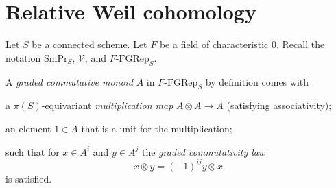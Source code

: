 \documentclass[a4paper,10pt]{article}
\def\basepieces{\mathscr{V}}
\def\smpr{\mathrm{SmPr}}
\newcommand{\fgrep}[2]{#1\textrm{-}\mathrm{FGRep}_{#2}}
\def\tensor{\otimes}
\begin{document}
\section{Relative Weil cohomology}

Let $S$ be a connected scheme. Let $F$ be a field of characteristic $0$. Recall
the notation $\smpr_{S}$, $\basepieces$, and $\fgrep{F}{S}$.

A \emph{graded commutative monoid} $A$ in $\fgrep{F}{S}$ by definition comes
with
\begin{enumerate*}[label=(\alph*)] %
	\item a $\pi(S)$-equivariant \emph{multiplication map} $A \tensor A \to
		A$ (satisfying associativity);
	\item an element $1 \in A$ that is a unit for the multiplication;
\end{enumerate*} %
such that for $x \in A^{i}$ and $y \in A^{j}$ the \emph{graded commutativity
law}
\[
	x \tensor y = (-1)^{ij} y \tensor x
\]
is satisfied.
\end{document}
